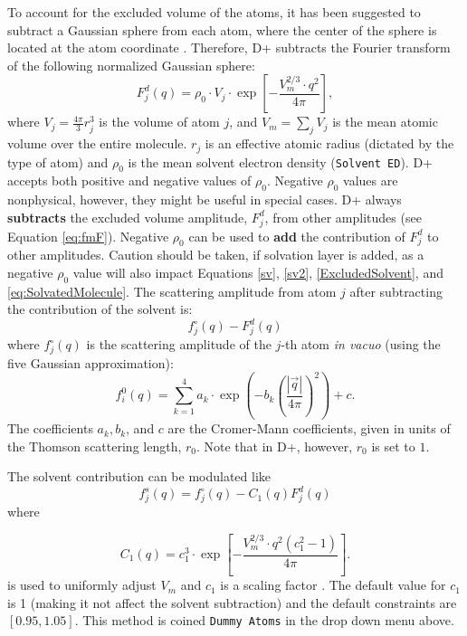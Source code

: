 \documentclass[../D+Manual.tex]{subfiles}
\begin{document}
To account for the excluded volume of the atoms, it has been suggested to subtract a Gaussian sphere from each atom, where the center of the sphere is located at the atom coordinate  \textcite{fraser1978improved}. Therefore, D+ subtracts the Fourier transform of the following normalized Gaussian sphere:
\begin{equation*}
	F^d_j\left(q\right) =
	\rho_{0}\cdot V_j \cdot\exp
	\left[-\frac{V_m^{2/3}\cdot q^2}{4\pi}\right],
\end{equation*}
where $V_j=\frac{4\pi}{3}r^3_j$ is the volume of atom $j$, and $V_m = \sum_{j} V_j$ is the mean atomic volume over the entire molecule. $r_j$ is an effective atomic radius (dictated by the type of atom) and $\rho_{0}$ is the mean solvent electron density (\texttt{Solvent ED}). D+ accepts both positive and negative values of $\rho_{0}$. Negative $\rho_{0}$ values are nonphysical, however, they might be useful in special cases. D+ always \textbf{subtracts} the excluded volume amplitude, $F_j^d$, from other amplitudes (see Equation \ref{eq:fmF}). Negative $\rho_{0}$ can be used to \textbf{add} the contribution of $F_j^d$ to other amplitudes. Caution should be taken, if solvation layer is added, as a negative $\rho_0$ value will also impact Equations \ref{sv}, \ref{sv2}, \ref{ExcludedSolvent}, and \ref{eq:SolvatedMolecule}.
The scattering amplitude from atom $j$ after subtracting the contribution of the solvent is:
\begin{equation}
f^\circ_j\left( q \right) -F_j^d\left( q \right) 
\label{eq:fmF}
\end{equation}
where $f^\circ_j\left( q \right)$ is the scattering amplitude of the $j$-th atom \textit{in vacuo} (using the five Gaussian approximation):
\begin{equation}\label{FiveGaussinan}
f_{i}^{0}\left(q\right)=\sum_{k=1}^{4}a_{k}\cdot \exp{\left(-b_{k}\left(\frac{\left|\vec{q}\right|}{4\pi}\right)^{2}\right)}+c.
\end{equation}
The coefficients $a_{k},b_{k}$, and $c$ are the Cromer-Mann coefficients, given in units of the Thomson scattering length, $r_0$. Note that in D+, however, $r_0$ is set to $1$.

The solvent contribution can be modulated like
\begin{equation*}
f_{j}^{s}(q)=f^\circ_j\left( q \right) - C_1\left(q\right) F^d_j\left( q \right) 
\end{equation*}
where

\begin{equation*}
C_1\left(q\right) = c^3_1\cdot\exp
	\left[-\frac{V_m^{2/3}\cdot q^2\left(c_1^2 -1\right)}{4\pi}\right].
	\label{c1}
\end{equation*}
is used to uniformly adjust $V_m$ and $c_1$ is a scaling factor \parencite{schneidman2013accurate}.
The default value for $c_1$ is 1 (making it not affect the solvent subtraction) and the default constraints are $\left[0.95,1.05\right]$.
This method is coined \texttt{Dummy Atoms} in the drop down menu above.
\end{document}
